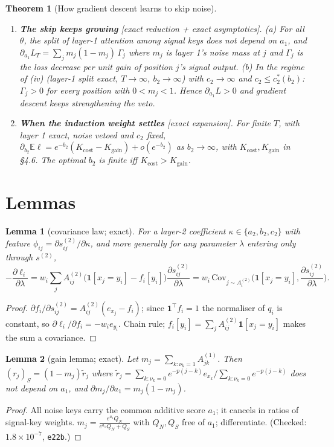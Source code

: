 \documentclass[11pt]{article}
\newtheorem{theorem}{Theorem}\newtheorem{lemma}{Lemma}\newtheorem{proposition}{Proposition}
\theoremstyle{definition}\newtheorem{assumption}{Assumption}\newtheorem{definition}{Definition}
\theoremstyle{remark}\newtheorem{remark}{Remark}
\newcommand{\1}{\mathbf{1}}\newcommand{\E}{\mathbb E}
\begin{document}
\begin{theorem}[How gradient descent learns to skip noise]
\begin{enumerate}[label=(\roman*),leftmargin=2em]
\item \textbf{The skip keeps growing} [exact reduction + exact asymptotics]. (a) For all $\theta$, the
split of layer-1 attention among signal keys does not depend on $a_1$, and
$\partial_{a_1}L_T=\sum_jm_j(1-m_j)\,\Gamma_j$ where $m_j$ is layer 1's noise mass at $j$ and $\Gamma_j$ is the
loss decrease per unit gain of position $j$'s signal output. (b) In the regime of (iv) (layer-1 split
exact, $T\to\infty$, $b_2\to\infty$) with $c_2\to\infty$ and $c_2\le c_2^\ast(b_2)$: $\Gamma_j>0$ for every position
with $0<m_j<1$. Hence $\partial_{a_1}L>0$ and gradient descent keeps strengthening the veto.

\item \textbf{When the induction weight settles} [exact expansion]. For finite $T$, with layer 1 exact,
noise vetoed and $c_2$ fixed, $\partial_{b_2}\E\ell=e^{-b_2}(K_{\mathrm{cost}}-K_{\mathrm{gain}})+o(e^{-b_2})$ as
$b_2\to\infty$, with $K_{\mathrm{cost}},K_{\mathrm{gain}}$ in \S4.6. The optimal $b_2$ is finite iff
$K_{\mathrm{cost}}>K_{\mathrm{gain}}$.
\end{enumerate}
\end{theorem}

\section{Lemmas}
\begin{lemma}[covariance law; exact]\label{lem:cov}
For a layer-2 coefficient $\kappa\in\{a_2,b_2,c_2\}$ with feature $\phi_{ij}=\partial s^{(2)}_{ij}/\partial\kappa$, and
more generally for any parameter $\lambda$ entering only through $s^{(2)}$,
\[
-\frac{\partial\ell_i}{\partial\lambda}=w_i\sum_jA^{(2)}_{ij}\big(\1[x_j=y_i]-f_i[y_i]\big)\frac{\partial s^{(2)}_{ij}}{\partial\lambda}
= w_i\,\mathrm{Cov}_{j\sim A^{(2)}_i}\Big(\1[x_j=y_i],\frac{\partial s^{(2)}_{ij}}{\partial\lambda}\Big).
\]
\end{lemma}
\begin{proof}
$\partial f_i/\partial s^{(2)}_{ij}=A^{(2)}_{ij}(e_{x_j}-f_i)$; since $\1^\top f_i=1$ the normaliser of $q_i$ is constant,
so $\partial\ell_i/\partial f_i=-w_ie_{y_i}$. Chain rule; $f_i[y_i]=\sum_jA^{(2)}_{ij}\1[x_j=y_i]$ makes the sum a covariance.
\end{proof}

\begin{lemma}[gain lemma; exact]\label{lem:gain}
Let $m_j=\sum_{k:\nu_k=1}A^{(1)}_{jk}$. Then $(r_j)_S=(1-m_j)\tilde r_j$ where
$\tilde r_j=\sum_{k:\nu_k=0}e^{-p(j-k)}e_{x_k}/\sum_{k:\nu_k=0}e^{-p(j-k)}$ does not depend on $a_1$, and
$\partial m_j/\partial a_1=m_j(1-m_j)$.
\end{lemma}
\begin{proof}
All noise keys carry the common additive score $a_1$; it cancels in ratios of signal-key weights.
$m_j=\frac{e^{a_1}Q_N}{e^{a_1}Q_N+Q_S}$ with $Q_N,Q_S$ free of $a_1$; differentiate. (Checked: $1.8\times10^{-7}$, \texttt{e22b}.)
\end{proof}
\end{document}
